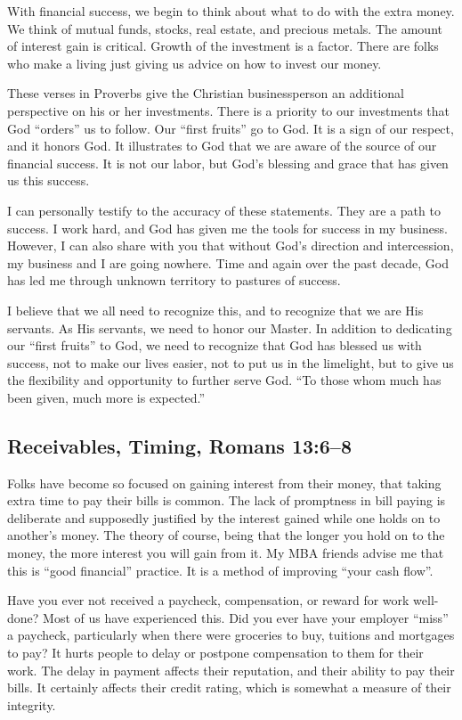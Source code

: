 \documentclass[12pt]{memoir}
\begin{document}
With financial success, we begin to think about what to do with the
extra money. We think of mutual funds, stocks, real estate, and precious
metals. The amount of interest gain is critical. Growth of the investment
is a factor. There are folks who make a living just giving us advice
on how to invest our money. 

These verses in Proverbs give the Christian businessperson an additional
perspective on his or her investments. There is a priority to our
investments that God ``orders'' us to follow. Our ``first fruits''
go to God. It is a sign of our respect, and it honors God. It illustrates
to God that we are aware of the source of our financial success. It
is not our labor, but God's blessing and grace that has given us this
success. 

I can personally testify to the accuracy of these statements. They
are a path to success. I work hard, and God has given me the tools
for success in my business. However, I can also share with you that
without God's direction and intercession, my business and I are going
nowhere. Time and again over the past decade, God has led me through
unknown territory to pastures of success. 

I believe that we all need to recognize this, and to recognize that
we are His servants. As His servants, we need to honor our Master.
In addition to dedicating our ``first fruits'' to God, we need to
recognize that God has blessed us with success, not to make our lives
easier, not to put us in the limelight, but to give us the flexibility
and opportunity to further serve God. ``To those whom much has been
given, much more is expected.''

\subsection{Receivables, Timing, Romans 13:6--8}

Folks have become so focused on gaining interest from their money,
that taking extra time to pay their bills is common. The lack of promptness
in bill paying is deliberate and supposedly justified by the interest
gained while one holds on to another's money. The theory of course,
being that the longer you hold on to the money, the more interest
you will gain from it. My MBA friends advise me that this is ``good
financial'' practice. It is a method of improving ``your cash flow''. 

Have you ever not received a paycheck, compensation, or reward for
work well-done? Most of us have experienced this. Did you ever have
your employer ``miss'' a paycheck, particularly when there were
groceries to buy, tuitions and mortgages to pay? It hurts people to
delay or postpone compensation to them for their work. The delay in
payment affects their reputation, and their ability to pay their bills.
It certainly affects their credit rating, which is somewhat a measure
of their integrity.
\end{document}
